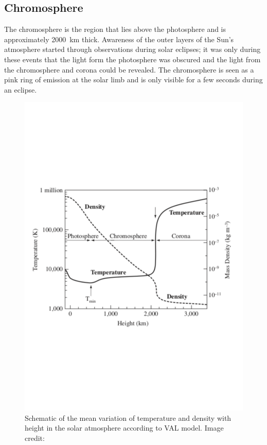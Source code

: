 \subsection{Chromosphere}
\label{Chp1_atmosphere_chromosphere}
The chromosphere is the region that lies above the photosphere and is approximately 2000~km thick. Awareness of the outer layers of the Sun's atmosphere started through observations during solar eclipses; it was only during these events that the light form the photosphere was obscured and the light from the chromosphere and corona could be revealed. The chromosphere is seen as a pink ring of emission at the solar limb and is only visible for a few seconds during an eclipse.

\begin{figure}
    \centering
    \includegraphics[scale=0.5]{Figures/1-Introduction/val_model_MHD_of_Sun_textbook.pdf}
    \caption[VAL model that shows the mean variation of temperature and density with height in the solar atmosphere]{Schematic of the mean variation of temperature and density with height in the solar atmosphere according to VAL model. Image credit: \citet{Priest_2014_MHD_sun}}
    \label{fig:val_model}
\end{figure}

